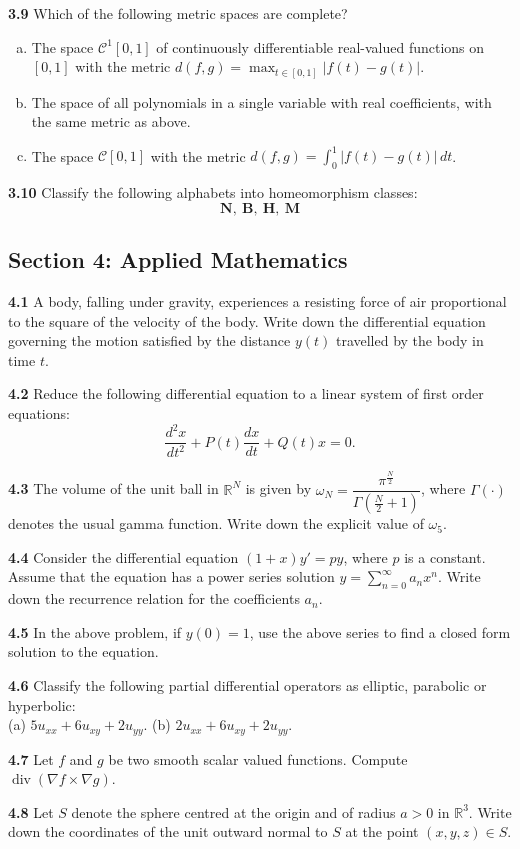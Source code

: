 \documentclass[11pt,a4paper]{article}
\newcommand{\R}{\mathbb{R}}
\newcommand{\divg}{\operatorname{div}}
\newcommand{\examsec}[1]{%
  \subsection*{#1}
  \vspace{-2pt}
}
\newcommand{\qitem}[1]{\par\medskip\noindent\textbf{#1}\hspace{0.5em}}
\begin{document}
\qitem{3.9} Which of the following metric spaces are complete?
\begin{enumerate}[(a)]
  \item The space $\mathcal{C}^1[0, 1]$ of continuously differentiable real-valued functions on $[0, 1]$ with the metric $d(f, g) = \max_{t \in [0, 1]} |f(t) - g(t)|$.
  \item The space of all polynomials in a single variable with real coefficients, with the same metric as above.
  \item The space $\mathcal{C}[0, 1]$ with the metric $d(f, g) = \int_0^1 |f(t) - g(t)|\,dt$.
\end{enumerate}

\qitem{3.10} Classify the following alphabets into homeomorphism classes:
\[
  \mathbf{N,\ B,\ H,\ M}
\]

\examsec{Section 4: Applied Mathematics}

\qitem{4.1} A body, falling under gravity, experiences a resisting force of air proportional to the square of the velocity of the body. Write down the differential equation governing the motion satisfied by the distance $y(t)$ travelled by the body in time $t$.

\qitem{4.2} Reduce the following differential equation to a linear system of first order equations:
\[
  \frac{d^2 x}{dt^2} + P(t)\frac{dx}{dt} + Q(t)x = 0.
\]

\qitem{4.3} The volume of the unit ball in $\R^N$ is given by $\omega_N = \dfrac{\pi^{\frac{N}{2}}}{\Gamma\left(\frac{N}{2} + 1\right)}$, where $\Gamma(\cdot)$ denotes the usual gamma function. Write down the explicit value of $\omega_5$.

\qitem{4.4} Consider the differential equation $(1 + x)y' = py$, where $p$ is a constant. Assume that the equation has a power series solution $y = \sum_{n=0}^{\infty} a_n x^n$. Write down the recurrence relation for the coefficients $a_n$.

\qitem{4.5} In the above problem, if $y(0) = 1$, use the above series to find a closed form solution to the equation.

\qitem{4.6} Classify the following partial differential operators as elliptic, parabolic or hyperbolic:\\
(a) $5u_{xx} + 6u_{xy} + 2u_{yy}$. \qquad (b) $2u_{xx} + 6u_{xy} + 2u_{yy}$.

\qitem{4.7} Let $f$ and $g$ be two smooth scalar valued functions. Compute $\divg(\nabla f \times \nabla g)$.

\qitem{4.8} Let $S$ denote the sphere centred at the origin and of radius $a > 0$ in $\R^3$. Write down the coordinates of the unit outward normal to $S$ at the point $(x, y, z) \in S$.
\end{document}
